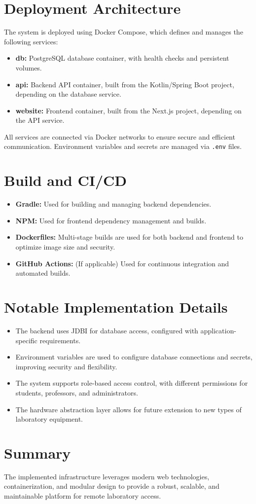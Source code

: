 \section{Deployment Architecture}

The system is deployed using Docker Compose, which defines and manages the following services:

\begin{itemize}
    \item \textbf{db:} PostgreSQL database container, with health checks and persistent volumes.
    \item \textbf{api:} Backend API container, built from the Kotlin/Spring Boot project, depending on the database service.
    \item \textbf{website:} Frontend container, built from the Next.js project, depending on the API service.
\end{itemize}

All services are connected via Docker networks to ensure secure and efficient communication. Environment variables and secrets are managed via \texttt{.env} files.

\section{Build and CI/CD}

\begin{itemize}
    \item \textbf{Gradle:} Used for building and managing backend dependencies.
    \item \textbf{NPM:} Used for frontend dependency management and builds.
    \item \textbf{Dockerfiles:} Multi-stage builds are used for both backend and frontend to optimize image size and security.
    \item \textbf{GitHub Actions:} (If applicable) Used for continuous integration and automated builds.
\end{itemize}

\section{Notable Implementation Details}

\begin{itemize}
    \item The backend uses JDBI for database access, configured with application-specific requirements.
    \item Environment variables are used to configure database connections and secrets, improving security and flexibility.
    \item The system supports role-based access control, with different permissions for students, professors, and administrators.
    \item The hardware abstraction layer allows for future extension to new types of laboratory equipment.
\end{itemize}

\section{Summary}

The implemented infrastructure leverages modern web technologies, containerization, and modular design to provide a robust, scalable, and maintainable platform for remote laboratory access.